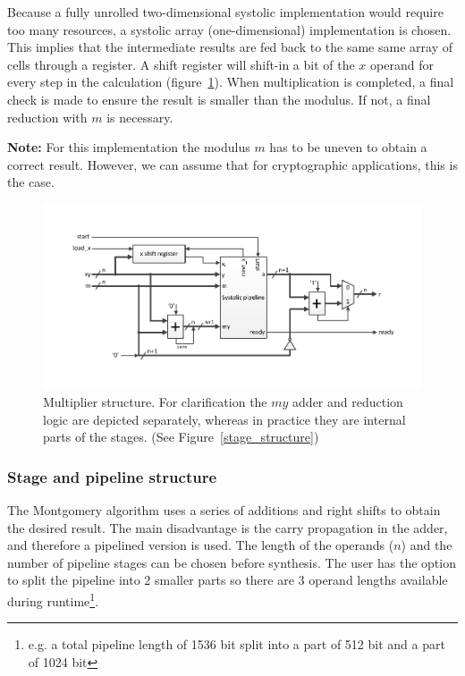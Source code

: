 Because a fully unrolled two-dimensional systolic implementation would require too many resources, a systolic array (one-dimensional) implementation is chosen. This implies that the intermediate results are fed back to the same same array of cells through a register. A shift register will shift-in a bit of the $x$ operand for every step in the calculation (figure~\ref{mult_structure}). When multiplication is completed, a final check is made to ensure the result is smaller than the modulus. If not, a final reduction with $m$ is necessary.

\textbf{Note:} For this implementation the modulus $m$ has to be uneven to obtain a correct result. However, we can assume that for cryptographic applications, this is the case.


\begin{figure}[H] 
\centering 
\includegraphics[trim=1.2cm 1.2cm 1.2cm 1.2cm, width=15cm]{pictures/mult_structure.pdf}
\caption{Multiplier structure. For clarification the $my$ adder and reduction logic are depicted separately, whereas in practice they are internal parts of the stages. (See Figure~\ref{stage_structure})}
\label{mult_structure}
\end{figure}

\subsubsection{Stage and pipeline structure}
The Montgomery algorithm uses a series of additions and right shifts to obtain the desired result. The main disadvantage
is the carry propagation in the adder, and therefore a pipelined version is used. The length of the operands ($n$) and
the number of pipeline stages can be chosen before synthesis. The user has the option to split the pipeline into 2
smaller parts so there are 3 operand lengths available during runtime\footnote{e.g. a total pipeline length of 1536 bit
split into a part of 512 bit and a part of 1024 bit}.

